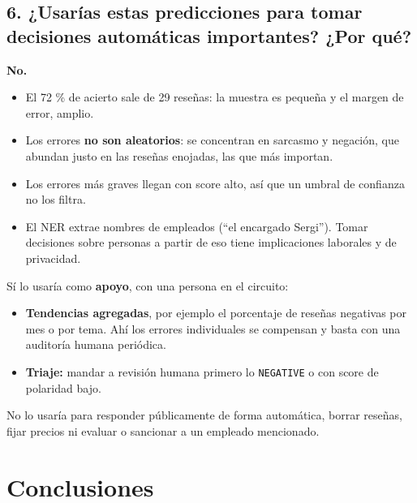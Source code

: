 \documentclass[12pt,a4paper]{article}
\begin{document}
\subsection{6. ¿Usarías estas predicciones para tomar decisiones automáticas importantes? ¿Por qué?}

\textbf{No.}

\begin{itemize}[leftmargin=1.2em]
\item
  El 72 \% de acierto sale de 29 reseñas: la muestra es pequeña y el margen de error, amplio.
\item
  Los errores \textbf{no son aleatorios}: se concentran en sarcasmo y negación, que abundan justo en las
  reseñas enojadas, las que más importan.
\item
  Los errores más graves llegan con score alto, así que un umbral de confianza no los filtra.
\item
  El NER extrae nombres de empleados (``el encargado Sergi''). Tomar decisiones sobre personas a
  partir de eso tiene implicaciones laborales y de privacidad.
\end{itemize}

Sí lo usaría como \textbf{apoyo}, con una persona en el circuito:

\begin{itemize}[leftmargin=1.2em]
\item
  \textbf{Tendencias agregadas}, por ejemplo el porcentaje de reseñas negativas por mes o por tema. Ahí
  los errores individuales se compensan y basta con una auditoría humana periódica.
\item
  \textbf{Triaje:} mandar a revisión humana primero lo \texttt{NEGATIVE} o con score de polaridad bajo.
\end{itemize}

No lo usaría para responder públicamente de forma automática, borrar reseñas, fijar precios ni
evaluar o sancionar a un empleado mencionado.


\section{Conclusiones}
\end{document}
